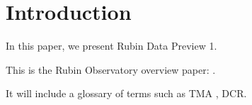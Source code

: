 \section{Introduction}

In this paper, we present Rubin Data Preview 1.
\vskip 0.4in


This is the Rubin Observatory overview paper: \citet{2019ApJ...873..111I}.

It will include a glossary of terms such as \gls{TMA} , \gls{DCR}.


